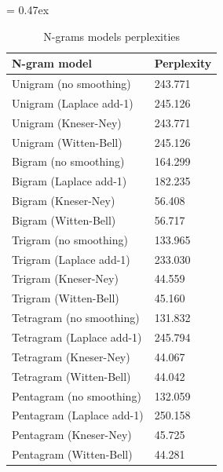 \begin{table}[t]
	\caption{N-grams models perplexities}
	\extrarowsep = 0.47ex
	\centering
	\begin{tabu} to 0.29\textwidth { X[2.5,l,m] X[r,m] }
		\rowfont{\bfseries\itshape} N-gram model & Perplexity \\
		\hline
		Unigram (no smoothing)		&	243.771		\\
		Unigram (Laplace add-1)		&	245.126		\\
		Unigram (Kneser-Ney)		&	243.771		\\
		Unigram (Witten-Bell)		&	245.126		\\
		Bigram (no smoothing)		&	164.299		\\
		Bigram (Laplace add-1)		&	182.235		\\
		Bigram (Kneser-Ney)			&	 56.408		\\
		Bigram (Witten-Bell)		&	 56.717		\\
		Trigram (no smoothing)		&	133.965		\\
		Trigram (Laplace add-1)		&	233.030		\\
		Trigram (Kneser-Ney)		&	 44.559		\\
		Trigram (Witten-Bell)		&	 45.160		\\
		Tetragram (no smoothing)	&	131.832		\\
		Tetragram (Laplace add-1)	&	245.794		\\
		Tetragram (Kneser-Ney)		&	 44.067		\\
		Tetragram (Witten-Bell)		&	 44.042		\\
		Pentagram (no smoothing)	&	132.059		\\
		Pentagram (Laplace add-1)	&	250.158		\\
		Pentagram (Kneser-Ney)		&	 45.725		\\
		Pentagram (Witten-Bell)		&	 44.281		\\
	\end{tabu}
	\label{tab:n-grams-models-perplexities}
\end{table}
